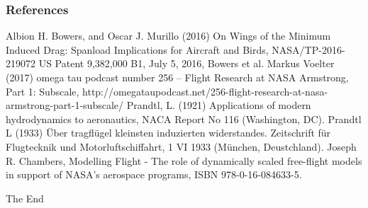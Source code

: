 \documentclass{beamer}
\begin{document}

\begin{frame}
\frametitle{References}
\footnotesize{
\begin{thebibliography}{99} %

 Albion H. Bowers, and Oscar J. Murillo (2016) On Wings of the Minimum Induced Drag:  Spanload Implications for Aircraft and Birds, NASA/TP-2016-219072
 US Patent 9,382,000 B1, July 5, 2016, Bowers et al.
 Markus Voelter (2017) omega tau podcast number 256 – Flight Research at NASA Armstrong, Part 1: Subscale, http://omegataupodcast.net/256-flight-research-at-nasa-armstrong-part-1-subscale/
 Prandtl, L.  (1921)  Applications  of  modern hydrodynamics  to  aeronautics,  NACA  Report  No  116 (Washington, DC).
 Prandtl L (1933) Über tragfl\"ugel kleinsten induzierten widerstandes. Zeitschrift für Flugtecknik und Motorluftschiffahrt, 1 VI 1933 (M\"unchen, Deustchland).
 Joseph R. Chambers, Modelling Flight - The role of dynamically scaled free-flight models in support of NASA's aerospace programs, ISBN 978-0-16-084633-5.


\end{thebibliography}
}
\end{frame}


\begin{frame}
\Huge{\centerline{The End}}
\end{frame}

\end{document}

